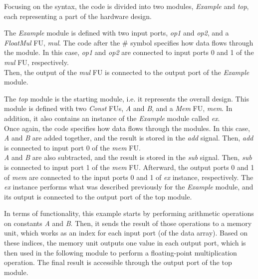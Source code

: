 Focusing on the syntax, the code is divided into two modules, \textit{Example} and \textit{top}, each representing a part of the hardware design.

The \textit{Example} module is defined with two input ports, \textit{op1} and \textit{op2}, and a \textit{FloatMul} FU, \textit{mul}. 
The code after the \# symbol specifies how data flows through the module. In this case, \textit{op1} and \textit{op2} are connected to input ports 0 and 1 of the \textit{mul} FU, respectively. \\
Then, the output of the \textit{mul} FU is connected to the output port of the \textit{Example} module.

The \textit{top} module is the starting module, i.e. it represents the overall design.
This module is defined with two \textit{Const} FUs, \textit{A} and \textit{B}, and a \textit{Mem} FU, \textit{mem}. In addition, it also contains an instance of the \textit{Example} module called \textit{ex}.\\
Once again, the code specifies how data flows through the modules. In this case, \textit{A} and \textit{B} are added together, and the result is stored in the \textit{add} signal. Then, \textit{add} is connected to input port 0 of the \textit{mem} FU.\\
\textit{A} and \textit{B} are also subtracted, and the result is stored in the \textit{sub} signal. Then, \textit{sub} is connected to input port 1 of the \textit{mem} FU.
Afterward, the output ports 0 and 1 of \textit{mem} are connected to the input ports 0 and 1 of \textit{ex} instance, respectively. 
The \textit{ex} instance performs what was described previously for the \textit{Example} module, and its output is connected to the output port of the top module.

In terms of functionality, this example starts by performing arithmetic operations on constants \textit{A} and \textit{B}. Then, it sends the result of those operations to a memory unit, which works as an index for each input port (of the data array). Based on these indices, the memory unit outputs one value in each output port, which is then used in the following module to perform a floating-point multiplication operation. The final result is accessible through the output port of the top module.
